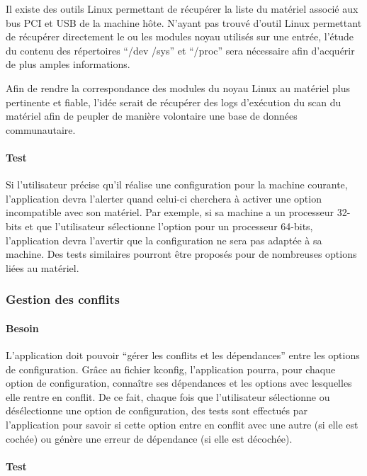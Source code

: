 \documentclass[16pts]{report}
\begin{document}
Il existe des outils Linux permettant de récupérer la liste du matériel associé
aux bus PCI et USB de la machine hôte.  N’ayant pas trouvé d’outil Linux
permettant de récupérer directement le ou les modules noyau utilisés sur une
entrée, l’étude du contenu des répertoires “/dev /sys” et “/proc” sera
nécessaire afin d’acquérir de plus amples informations.

Afin de rendre la correspondance des modules du noyau Linux au matériel plus
pertinente et fiable, l’idée serait de récupérer des logs d’exécution du scan
du matériel afin de peupler de manière volontaire une base de données
communautaire.

\paragraph{Test}
\label{sssbus:Test}

Si l’utilisateur précise qu’il réalise une configuration pour la machine
courante, l’application devra l’alerter quand celui-ci cherchera à activer une
option incompatible avec son matériel. Par exemple, si sa machine a un
processeur 32-bits et que l’utilisateur sélectionne l’option pour un processeur
64-bits, l’application devra l’avertir que la configuration ne sera pas adaptée
à sa machine. Des tests similaires pourront être proposés pour de nombreuses
options liées au matériel.


\subsubsection{Gestion des conflits}
\label{sec:Gestion des conflits}
\paragraph{Besoin}
\label{sub:Besoin}

L’application doit pouvoir “gérer les conflits et les dépendances” entre les
options de configuration. Grâce au fichier kconfig, l’application pourra, pour
chaque option de configuration, connaître ses dépendances et les options avec
lesquelles elle rentre en conflit. De ce fait, chaque fois que l’utilisateur
sélectionne ou désélectionne une option de configuration, des tests sont
effectués par l'application pour savoir si cette option entre en conflit avec
une autre (si elle est cochée) ou génère une erreur de dépendance (si elle est
décochée).

\paragraph{Test}
\label{sub:Test}
\end{document}
